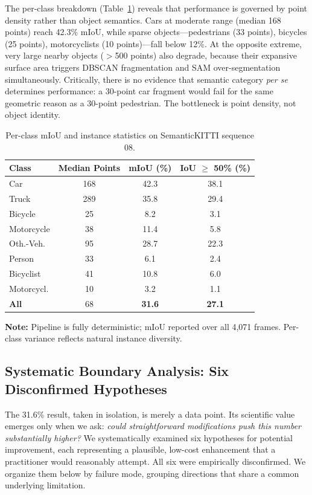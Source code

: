 \documentclass{article}
\begin{document}
The per-class breakdown (Table~\ref{tab:perclass}) reveals that performance is governed
by point density rather than object semantics. Cars at moderate range (median 168 points)
reach 42.3\% mIoU, while sparse objects---pedestrians (33 points), bicycles (25 points),
motorcyclists (10 points)---fall below 12\%. At the opposite extreme, very large nearby
objects ($>$500 points) also degrade, because their expansive surface area triggers
DBSCAN fragmentation and SAM over-segmentation simultaneously. Critically, there is no
evidence that semantic category \emph{per se} determines performance: a 30-point car
fragment would fail for the same geometric reason as a 30-point pedestrian. The
bottleneck is point density, not object identity.

\begin{table}[t]
\centering
\caption{Per-class mIoU and instance statistics on SemanticKITTI sequence 08.}
\label{tab:perclass}
\begin{tabular}{lccc}
\toprule
Class & Median Points & mIoU (\%) & IoU $\geq$ 50\% (\%) \\
\midrule
Car        & 168 & 42.3 & 38.1 \\
Truck      & 289 & 35.8 & 29.4 \\
Bicycle    &  25 &  8.2 &  3.1 \\
Motorcycle &  38 & 11.4 &  5.8 \\
Oth.-Veh.  &  95 & 28.7 & 22.3 \\
Person     &  33 &  6.1 &  2.4 \\
Bicyclist  &  41 & 10.8 &  6.0 \\
Motorcycl. &  10 &  3.2 &  1.1 \\
\midrule
\textbf{All} & 68 & \textbf{31.6} & \textbf{27.1} \\
\bottomrule
\end{tabular}

\vspace{2pt}
{\footnotesize \textbf{Note:} Pipeline is fully deterministic; mIoU reported over all
4,071 frames. Per-class variance reflects natural instance diversity.}
\end{table}

\subsection{Systematic Boundary Analysis: Six Disconfirmed Hypotheses}
\label{sec:boundary}

The 31.6\% result, taken in isolation, is merely a data point. Its scientific value
emerges only when we ask: \emph{could straightforward modifications push this number
substantially higher?} We systematically examined six hypotheses for potential
improvement, each representing a plausible, low-cost enhancement that a practitioner
would reasonably attempt. All six were empirically disconfirmed. We organize them below
by failure mode, grouping directions that share a common underlying limitation.
\end{document}

